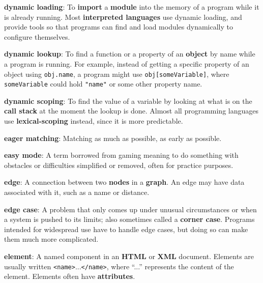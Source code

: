 \documentclass[krantzl]{krantz}
\newcommand{\glosskey}[1]{\textbf{#1}}
\begin{document}
\noindent \textbf{{\newline}\glosskey{dynamic loading}}: 
To \glosskey{import} a \glosskey{module} into the memory of a program while it is already running. Most \glosskey{interpreted languages} use dynamic loading, and provide tools so that programs can find and load modules dynamically to configure themselves.


\noindent \textbf{{\newline}\glosskey{dynamic lookup}}: 
To find a function or a property of an \glosskey{object} by name while a program is running. For example, instead of getting a specific property of an object using \texttt{obj.name}, a program might use \texttt{obj[someVariable]}, where \texttt{someVariable} could hold \texttt{"name"} or some other property name.


\noindent \textbf{{\newline}\glosskey{dynamic scoping}}: 
To find the value of a variable by looking at what is on the \glosskey{call stack} at the moment the lookup is done. Almost all programming languages use \glosskey{lexical-scoping} instead, since it is more predictable.


\noindent \textbf{{\newline}\glosskey{eager matching}}: 
Matching as much as possible, as early as possible.


\noindent \textbf{{\newline}\glosskey{easy mode}}: 
A term borrowed from gaming meaning to do something with obstacles or difficulties simplified or removed, often for practice purposes.


\noindent \textbf{{\newline}\glosskey{edge}}: 
A connection between two \glosskey{nodes} in a \glosskey{graph}. An edge may have data associated with it, such as a name or distance.


\noindent \textbf{{\newline}\glosskey{edge case}}: 
A problem that only comes up under unusual circumstances or when a system is pushed to its limits; also sometimes called a \glosskey{corner case}. Programs intended for widespread use have to handle edge cases, but doing so can make them much more complicated.


\noindent \textbf{{\newline}\glosskey{element}}: 
A named component in an \glosskey{HTML} or \glosskey{XML} document. Elements are usually written \texttt{<name>}...\texttt{</name>}, where “...” represents the content of the element. Elements often have \glosskey{attributes}.
\end{document}
